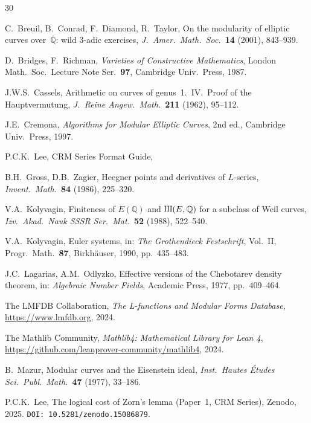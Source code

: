 \documentclass[11pt]{article}
\theoremstyle{plain}
\theoremstyle{definition}
\theoremstyle{remark}
\newcommand{\Q}{\mathbb{Q}}
\newcommand{\Sha}{\text{\raisebox{0.05ex}{\scalebox{0.85}[1]{III}}}}
\begin{document}
\begin{thebibliography}{30}

C.~Breuil, B.~Conrad, F.~Diamond, R.~Taylor,
On the modularity of elliptic curves over~$\Q$: wild 3-adic exercises,
\emph{J.\ Amer.\ Math.\ Soc.}\ \textbf{14} (2001), 843--939.

D.~Bridges, F.~Richman,
\emph{Varieties of Constructive Mathematics},
London Math.\ Soc.\ Lecture Note Ser.\ \textbf{97}, Cambridge Univ.\ Press, 1987.

J.W.S.~Cassels,
Arithmetic on curves of genus~1.\ IV.\ Proof of the Hauptvermutung,
\emph{J.\ Reine Angew.\ Math.}\ \textbf{211} (1962), 95--112.

J.E.~Cremona,
\emph{Algorithms for Modular Elliptic Curves}, 2nd ed.,
Cambridge Univ.\ Press, 1997.

P.C.K.~Lee,
CRM Series Format Guide,

B.H.~Gross, D.B.~Zagier,
Heegner points and derivatives of $L$-series,
\emph{Invent.\ Math.}\ \textbf{84} (1986), 225--320.

V.A.~Kolyvagin,
Finiteness of $E(\Q)$ and $\Sha(E,\Q)$ for a subclass of Weil curves,
\emph{Izv.\ Akad.\ Nauk SSSR Ser.\ Mat.}\ \textbf{52} (1988), 522--540.

V.A.~Kolyvagin,
Euler systems,
in: \emph{The Grothendieck Festschrift}, Vol.~II, Progr.\ Math.\ \textbf{87}, Birkh\"auser, 1990, pp.~435--483.

J.C.~Lagarias, A.M.~Odlyzko,
Effective versions of the Chebotarev density theorem,
in: \emph{Algebraic Number Fields}, Academic Press, 1977, pp.~409--464.

The LMFDB Collaboration,
\emph{The L-functions and Modular Forms Database},
\url{https://www.lmfdb.org}, 2024.

The Mathlib Community,
\emph{Mathlib4: Mathematical Library for Lean 4},
\url{https://github.com/leanprover-community/mathlib4}, 2024.

B.~Mazur,
Modular curves and the Eisenstein ideal,
\emph{Inst.\ Hautes \'Etudes Sci.\ Publ.\ Math.}\ \textbf{47} (1977), 33--186.

P.C.K.~Lee,
The logical cost of Zorn's lemma (Paper~1, CRM Series),
Zenodo, 2025. \texttt{DOI: 10.5281/zenodo.15086879}.


\end{thebibliography}
\end{document}
